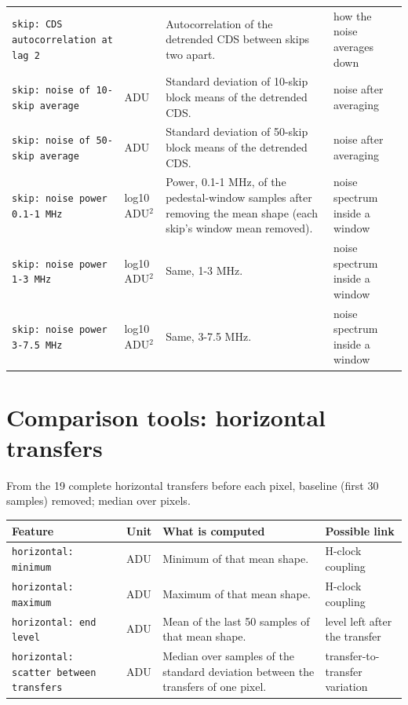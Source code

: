 \documentclass[10pt]{article}
\begin{document}
\begin{longtable}{>{\raggedright\arraybackslash}p{}>{\raggedright\arraybackslash}p{}>{\raggedright\arraybackslash}p{}>{\raggedright\arraybackslash}p{}}
\texttt{skip: CDS autocorrelation at lag 2} &  & Autocorrelation of the detrended CDS between skips two apart. & how the noise averages down \\
\texttt{skip: noise of 10-skip average} & ADU & Standard deviation of 10-skip block means of the detrended CDS. & noise after averaging \\
\texttt{skip: noise of 50-skip average} & ADU & Standard deviation of 50-skip block means of the detrended CDS. & noise after averaging \\
\texttt{skip: noise power 0.1-1 MHz} & log10 ADU$^{2}$ & Power, 0.1-1 MHz, of the pedestal-window samples after removing the mean shape (each skip's window mean removed). & noise spectrum inside a window \\
\texttt{skip: noise power 1-3 MHz} & log10 ADU$^{2}$ & Same, 1-3 MHz. & noise spectrum inside a window \\
\texttt{skip: noise power 3-7.5 MHz} & log10 ADU$^{2}$ & Same, 3-7.5 MHz. & noise spectrum inside a window \\
\end{longtable}

\section{Comparison tools: horizontal transfers}
From the 19 complete horizontal transfers before each pixel, baseline (first 30 samples) removed; median over pixels.

\begin{longtable}{>{\raggedright\arraybackslash}p{}>{\raggedright\arraybackslash}p{}>{\raggedright\arraybackslash}p{}>{\raggedright\arraybackslash}p{}}
\toprule Feature & Unit & What is computed & Possible link \\ \midrule \endhead
\bottomrule \endfoot
\texttt{horizontal: minimum} & ADU & Minimum of that mean shape. & H-clock coupling \\
\texttt{horizontal: maximum} & ADU & Maximum of that mean shape. & H-clock coupling \\
\texttt{horizontal: end level} & ADU & Mean of the last 50 samples of that mean shape. & level left after the transfer \\
\texttt{horizontal: scatter between transfers} & ADU & Median over samples of the standard deviation between the transfers of one pixel. & transfer-to-transfer variation \\
\end{longtable}
\end{document}
